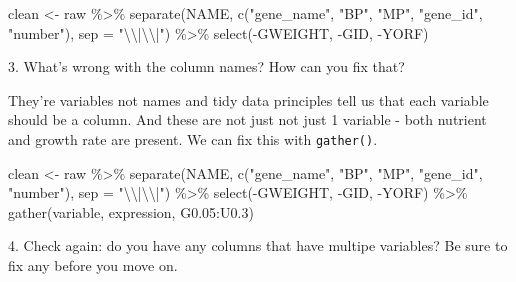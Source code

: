 \documentclass[
]{book}
\newenvironment{Shaded}{\begin{snugshade}}{\end{snugshade}}
\newcommand{\AttributeTok}[1]{\textcolor[rgb]{0.77,0.63,0.00}{#1}}
\newcommand{\FloatTok}[1]{\textcolor[rgb]{0.00,0.00,0.81}{#1}}
\newcommand{\FunctionTok}[1]{\textcolor[rgb]{0.00,0.00,0.00}{#1}}
\newcommand{\NormalTok}[1]{#1}
\newcommand{\OtherTok}[1]{\textcolor[rgb]{0.56,0.35,0.01}{#1}}
\newcommand{\SpecialCharTok}[1]{\textcolor[rgb]{0.00,0.00,0.00}{#1}}
\newcommand{\StringTok}[1]{\textcolor[rgb]{0.31,0.60,0.02}{#1}}
\begin{document}
\begin{Shaded}
\begin{Highlighting}[]
\NormalTok{clean }\OtherTok{\textless{}{-}}\NormalTok{ raw }\SpecialCharTok{\%\textgreater{}\%}
  \FunctionTok{separate}\NormalTok{(NAME, }\FunctionTok{c}\NormalTok{(}\StringTok{"gene\_name"}\NormalTok{, }\StringTok{"BP"}\NormalTok{, }\StringTok{"MP"}\NormalTok{, }\StringTok{"gene\_id"}\NormalTok{, }\StringTok{"number"}\NormalTok{), }\AttributeTok{sep =} \StringTok{"}\SpecialCharTok{\textbackslash{}\textbackslash{}}\StringTok{|}\SpecialCharTok{\textbackslash{}\textbackslash{}}\StringTok{|"}\NormalTok{) }\SpecialCharTok{\%\textgreater{}\%}
  \FunctionTok{select}\NormalTok{(}\SpecialCharTok{{-}}\NormalTok{GWEIGHT, }\SpecialCharTok{{-}}\NormalTok{GID, }\SpecialCharTok{{-}}\NormalTok{YORF)}
\end{Highlighting}
\end{Shaded}

3. What's wrong with the column names? How can you fix that?

They're variables not names and tidy data principles tell us that each variable should be a column. And these are not just not just 1 variable - both nutrient and growth rate are present. We can fix this with \texttt{gather()}.

\begin{Shaded}
\begin{Highlighting}[]
\NormalTok{clean }\OtherTok{\textless{}{-}}\NormalTok{ raw }\SpecialCharTok{\%\textgreater{}\%}
  \FunctionTok{separate}\NormalTok{(NAME, }\FunctionTok{c}\NormalTok{(}\StringTok{"gene\_name"}\NormalTok{, }\StringTok{"BP"}\NormalTok{, }\StringTok{"MP"}\NormalTok{, }\StringTok{"gene\_id"}\NormalTok{, }\StringTok{"number"}\NormalTok{), }\AttributeTok{sep =} \StringTok{"}\SpecialCharTok{\textbackslash{}\textbackslash{}}\StringTok{|}\SpecialCharTok{\textbackslash{}\textbackslash{}}\StringTok{|"}\NormalTok{) }\SpecialCharTok{\%\textgreater{}\%}
  \FunctionTok{select}\NormalTok{(}\SpecialCharTok{{-}}\NormalTok{GWEIGHT, }\SpecialCharTok{{-}}\NormalTok{GID, }\SpecialCharTok{{-}}\NormalTok{YORF) }\SpecialCharTok{\%\textgreater{}\%}
  \FunctionTok{gather}\NormalTok{(variable, expression, G0}\FloatTok{.05}\SpecialCharTok{:}\NormalTok{U0}\FloatTok{.3}\NormalTok{)}
\end{Highlighting}
\end{Shaded}

4. Check again: do you have any columns that have multipe variables? Be sure to fix any before you move on.
\end{document}
